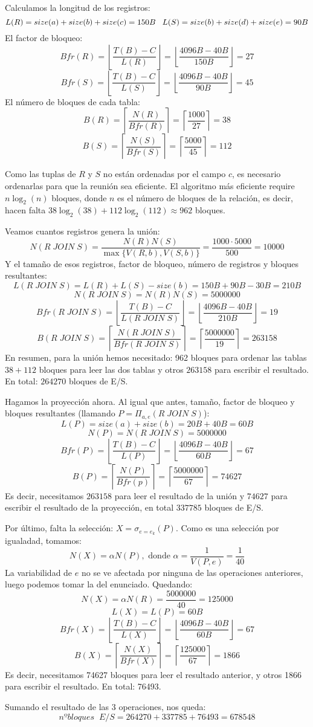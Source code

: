 \documentclass[12pt]{report}
\begin{document}
Calculamos la longitud de los registros:
\[
L(R)=size(a)+size(b)+size(c)=150B \;\;\; L(S)=size(b)+size(d)+size(e)=90B
\]
El factor de bloqueo:
\[
Bfr(R)=\left\lfloor\frac{T(B)-C}{L(R)}\right\rfloor=\left\lfloor\frac{4096B-40B}{150B}\right\rfloor=27
\]
\[
Bfr(S)=\left\lfloor\frac{T(B)-C}{L(S)}\right\rfloor=\left\lfloor\frac{4096B-40B}{90B}\right\rfloor=45
\]
El número de bloques de cada tabla:
\[
B(R)=\left\lceil\frac{N(R)}{Bfr(R)}\right\rceil=\left\lceil\frac{1000}{27}\right\rceil=38
\]
\[
B(S)=\left\lceil\frac{N(S)}{Bfr(S)}\right\rceil=\left\lceil\frac{5000}{45}\right\rceil=112
\]

Como las tuplas de $R$ y $S$ no están ordenadas por el campo $c$, es necesario ordenarlas para que la reunión sea eficiente. El algoritmo más eficiente require $n\log_2(n)$ bloques, donde $n$ es el número de bloques de la relación, es decir, hacen falta $38\log_2(38)+112\log_2(112)\approx 962$ bloques.

Veamos cuantos registros genera la unión:
\[
N(R\;JOIN\;S)=\frac{N(R)N(S)}{\max\{V(R,b),V(S,b)\}}= \frac{1000\cdot 5000}{500}=10000
\]
Y el tamaño de esos registros, factor de bloqueo, número de registros y bloques resultantes:
\[
L(R\;JOIN\;S)=L(R)+L(S)-size(b)=150B+90B-30B=210B
\]
\[
N(R\;JOIN\;S)=N(R)N(S)=5000000
\]
\[
Bfr(R\;JOIN\;S)=\left\lfloor\frac{T(B)-C}{L(R\;JOIN\;S)}\right\rfloor=\left\lfloor\frac{4096B-40B}{210B}\right\rfloor=19
\]
\[
B(R\;JOIN\;S)=\left\lceil\frac{N(R\;JOIN\;S)}{Bfr(R\;JOIN\;S)}\right\rceil=\left\lceil\frac{5000000}{19}\right\rceil=263158
\]
En resumen, para la unión hemos necesitado: 962 bloques para ordenar las tablas $38+112$ bloques para leer las dos tablas y otros $263158$ para escribir el resultado. En total: $264270$ bloques de E/S.

Hagamos la proyección ahora. Al igual que antes, tamaño, factor de bloqueo y bloques resultantes (llamando $P=\Pi_{a,e}(R\;JOIN\;S)$):
\[
L(P)=size(a)+size(b)=20B+40B=60B
\]
\[
N(P)=N(R\;JOIN\;S)=5000000
\]
\[
Bfr(P)=\left\lfloor\frac{T(B)-C}{L(P)}\right\rfloor=\left\lfloor\frac{4096B-40B}{60B}\right\rfloor=67
\]
\[
B(P)=\left\lceil\frac{N(P)}{Bfr(p)}\right\rceil=\left\lceil\frac{5000000}{67}\right\rceil=74627
\]
Es decir, necesitamos $263158$ para leer el resultado de la unión y $74627$ para escribir el resultado de la proyección, en total $337785$ bloques de E/S.

Por último, falta la selección: $X=\sigma_{e=e_k}(P)$. Como es una selección por igualadad, tomamos:
\[
N(X)=\alpha N(P), \text{ donde } \alpha=\frac{1}{V(P,e)}=\frac{1}{40}
\]
La variabilidad de $e$ no se ve afectada por ninguna de las operaciones anteriores, luego podemos tomar la del enunciado. Quedando:
\[
N(X)=\alpha N(R)=\frac{5000000}{40}=125000
\]
\[
L(X)=L(P)=60B
\]
\[
Bfr(X)=\left\lfloor\frac{T(B)-C}{L(X)}\right\rfloor=\left\lfloor\frac{4096B-40B}{60B}\right\rfloor=67
\]
\[
B(X)=\left\lceil\frac{N(X)}{Bfr(X)}\right\rceil=\left\lceil\frac{125000}{67}\right\rceil=1866
\]
Es decir, necesitamos 74627 bloques para leer el resultado anterior, y otros 1866 para escribir el resultado. En total: 76493.

Sumando el resultado de las 3 operaciones, nos queda:
\[
nºbloques \;\; E/S = 264270 + 337785 + 76493=678548
\]
\end{document}
